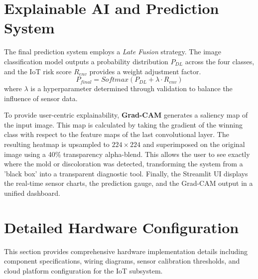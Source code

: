 \section[Explainable AI and Prediction System]{\textbf{Explainable AI and Prediction System}}
The final prediction system employs a \textit{Late Fusion} strategy. The image classification model outputs a probability distribution $P_{DL}$ across the four classes, and the IoT risk score $R_{env}$ provides a weight adjustment factor.
\begin{equation}
    P_{final} = Softmax(P_{DL} + \lambda \cdot R_{env})
\end{equation}
where $\lambda$ is a hyperparameter determined through validation to balance the influence of sensor data.

To provide user-centric explainability, \textbf{Grad-CAM} generates a saliency map of the input image. This map is calculated by taking the gradient of the winning class with respect to the feature maps of the last convolutional layer. The resulting heatmap is upsampled to $224 \times 224$ and superimposed on the original image using a 40\% transparency alpha-blend. This allows the user to see exactly where the mold or discoloration was detected, transforming the system from a 'black box' into a transparent diagnostic tool. Finally, the Streamlit UI displays the real-time sensor charts, the prediction gauge, and the Grad-CAM output in a unified dashboard.

\section[Detailed Hardware Configuration]{\textbf{Detailed Hardware Configuration}}
This section provides comprehensive hardware implementation details including component specifications, wiring diagrams, sensor calibration thresholds, and cloud platform configuration for the IoT subsystem.

